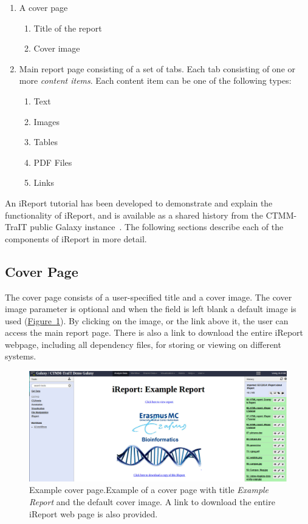 \begin{enumerate}
 \item A cover page
  \begin{enumerate}
    \item Title of the report
    \item Cover image
  \end{enumerate}
 \item Main report page consisting of a set of tabs. Each tab consisting of one or more \emph{content items}. Each content item can be one of the following types:
  \begin{enumerate}
    \item Text
    \item Images
    \item Tables
    \item PDF Files
    \item Links
  \end{enumerate}
\end{enumerate}

An iReport tutorial has been developed to demonstrate and explain the functionality of iReport, and is available as a shared history from the CTMM-TraIT public Galaxy instance~\cite{url-ireport-tutorial}. The following sections describe each of the components of iReport in more detail.

\subsection*{Cover Page}
The cover page consists of a user-specified title and a cover image. The cover image parameter is optional and when the field is left blank a default image is used (\hyperref[fig:defaultcover]{Figure~\ref*{fig:defaultcover}}).
By clicking on the image, or the link above it, the user can access the main report page. There is also a link to download the entire iReport webpage, including all dependency files, for storing or viewing on different systems.

\begin{figure}[h!]
    \includegraphics[width=\textwidth]{chapters/images/iReport/Hiltemann_defaultcover.jpg}
    \caption{Example cover page.Example of a cover page with title \emph{Example Report} and the default cover image. A link to download the entire iReport web page is also provided.}
    \label{fig:defaultcover}
\end{figure}



